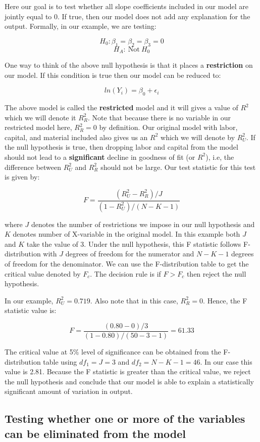 \documentclass[
]{book}
\theoremstyle{definition}
\theoremstyle{definition}
\theoremstyle{definition}
\theoremstyle{definition}
\theoremstyle{remark}
\begin{document}
Here our goal is to test whether all slope coefficients included in our model are jointly equal to 0. If true, then our model does not add any explanation for the output. Formally, in our example, we are testing:

\[H_0: \beta_1=\beta_2=\beta_3=0\]
\[H_A: \ \text{Not} \ H_0\]

One way to think of the above null hypothesis is that it places a \textbf{restriction} on our model. If this condition is true then our model can be reduced to:

\[ln(Y_i) =\beta_0 + \epsilon_i\]

The above model is called the \textbf{restricted} model and it will gives a value of \(R^2\) which we will denote it \(R^2_R\). Note that because there is no variable in our restricted model here, \(R^2_R=0\) by definition. Our original model with labor, capital, and material included also gives us an \(R^2\) which we will denote by \(R^2_U\). If the null hypothesis is true, then dropping labor and capital from the model should not lead to a \textbf{significant} decline in goodness of fit (or \(R^2\)), i.e, the difference between \(R^2_U\) and \(R^2_R\) should not be large. Our test statistic for this test is given by:

\[F =\frac{(R^2_U - R^2_R)/J}{(1-R^2_U)/(N-K-1)} \]

where \(J\) denotes the number of restrictions we impose in our null hypothesis and \(K\) denotes number of X-variable in the original model. In this example both \(J\) and \(K\) take the value of 3. Under the null hypothesis, this F statistic follows F-distribution with \(J\) degrees of freedom for the numerator and \(N-K-1\) degrees of freedom for the denominator. We can use the F-distribution table to get the critical value denoted by \(F_c\). The decision rule is if \(F>F_c\) then reject the null hypothesis.

In our example, \(R^2_U=0.719\). Also note that in this case, \(R^2_R=0\). Hence, the F statistic value is:

\[F=\frac{(0.80-0)/3}{(1-0.80)/(50-3-1)}=61.33\]

The critical value at 5\% level of significance can be obtained from the F-distribution table using \(df_1=J=3\) and \(df_2=N-K-1=46\). In our case this value is 2.81. Because the F statistic is greater than the critical value, we reject the null hypothesis and conclude that our model is able to explain a statistically significant amount of variation in output.

\hypertarget{testing-whether-one-or-more-of-the-variables-can-be-eliminated-from-the-model}{%
\subsection{Testing whether one or more of the variables can be eliminated from the model}\label{testing-whether-one-or-more-of-the-variables-can-be-eliminated-from-the-model}}
\end{document}
